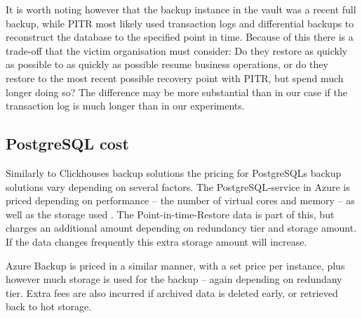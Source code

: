 It is worth noting however that the backup instance in the vault was a recent full backup, while PITR most likely used transaction logs and differential backups to reconstruct the database to the specified point in time. Because of this there is a trade-off that the victim organisation must consider: Do they restore as quickly as possible to as quickly as possible resume business operations, or do they restore to the most recent possible recovery point with PITR, but spend much longer doing so? The difference may be more substantial than in our case if the transaction log is much longer than in our experiments. 

\subsection{PostgreSQL cost}
Similarly to Clickhouses backup solutions the pricing for PostgreSQLs backup solutions vary depending on several factors. The PostgreSQL-service in Azure is priced depending on performance -- the number of virtual cores and memory -- as well as the storage used \cite{noauthor_pricing_nodate-1}. The Point-in-time-Restore data is part of this, but charges an additional amount depending on redundancy tier and storage amount. If the data changes frequently this extra storage amount will increase. 

Azure Backup is priced in a similar manner, with a set price per instance, plus however much storage is used for the backup -- again depending on redundany tier. Extra fees are also incurred if archived data is deleted early, or retrieved back to hot storage.
